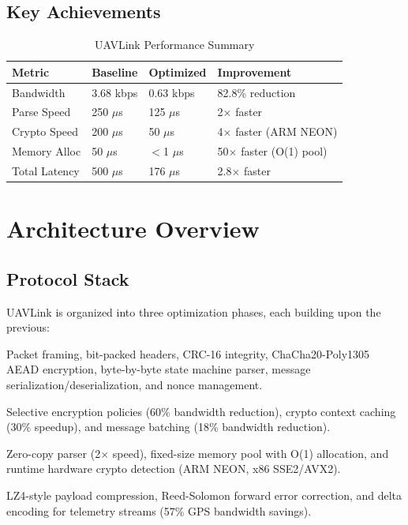 \documentclass[11pt,a4paper]{article}
\begin{document}
\subsection{Key Achievements}

\begin{table}[H]
\centering
\caption{UAVLink Performance Summary}
\begin{tabular}{@{}llll@{}}
\toprule
\textbf{Metric} & \textbf{Baseline} & \textbf{Optimized} & \textbf{Improvement} \\
\midrule
Bandwidth       & 3.68 kbps & 0.63 kbps & 82.8\% reduction \\
Parse Speed     & 250 $\mu$s & 125 $\mu$s & 2$\times$ faster \\
Crypto Speed    & 200 $\mu$s & 50 $\mu$s  & 4$\times$ faster (ARM NEON) \\
Memory Alloc    & 50 $\mu$s  & $<$1 $\mu$s & 50$\times$ faster (O(1) pool) \\
Total Latency   & 500 $\mu$s & 176 $\mu$s & 2.8$\times$ faster \\
\bottomrule
\end{tabular}
\end{table}

\section{Architecture Overview}

\subsection{Protocol Stack}

UAVLink is organized into three optimization phases, each building upon the previous:

\begin{description}[style=nextline]
    \item[Core Protocol (Phase 0)] Packet framing, bit-packed headers, CRC-16 integrity, ChaCha20-Poly1305 AEAD encryption, byte-by-byte state machine parser, message serialization/deserialization, and nonce management.
    \item[Phase 1 --- Quick Wins] Selective encryption policies (60\% bandwidth reduction), crypto context caching (30\% speedup), and message batching (18\% bandwidth reduction).
    \item[Phase 2 --- Performance] Zero-copy parser (2$\times$ speed), fixed-size memory pool with O(1) allocation, and runtime hardware crypto detection (ARM NEON, x86 SSE2/AVX2).
    \item[Phase 3 --- Advanced] LZ4-style payload compression, Reed-Solomon forward error correction, and delta encoding for telemetry streams (57\% GPS bandwidth savings).
\end{description}
\end{document}
